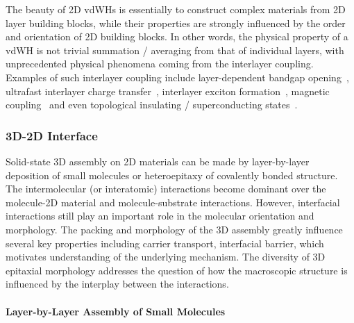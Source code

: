 The beauty of 2D vdWHs is essentially to construct complex materials
from 2D layer building blocks, while their properties are
strongly influenced by the order and orientation of 2D building
blocks.
%
In other words, the physical property of a vdWH is not trivial
summation / averaging from that of individual layers, with
unprecedented physical phenomena coming from the interlayer coupling.
%
Examples of such interlayer coupling include layer-dependent bandgap
opening~\autocite{Mak_2010_mos2,Raja_2017}, ultra\-fast interlayer charge
transfer~\autocite{Hong_2014_ultrafast_e_MoS2WS2,Zheng_2017_ultrafast_CT},
interlayer exciton formation~\autocite{Latini_2017_interlayer_ex},
magnetic coupling~\autocite{Huang_2017_magnet} and even topological
insulating / superconducting
states~\autocite{Cao_2018_insulator,Cao_2018_supercond}.


\subsubsection{3D-2D Interface}
\label{sec:intro-3D-2D}

Solid-state 3D assembly on 2D materials can be made by layer-by-layer
deposition of small molecules or hetero\-epitaxy of covalently bonded
structure. The intermolecular (or interatomic) interactions become
dominant over the molecule-2D material and molecule-substrate
interactions. However, interfacial interactions still play an
important role in the molecular orientation and morphology. The
packing and morphology of the 3D assembly greatly influence several
key properties including carrier transport, interfacial barrier, which
motivates understanding of the underlying mechanism.  The diversity of
3D epitaxial morphology addresses the question of how the macroscopic
structure is influenced by the interplay between the interactions.


\paragraph{Layer-by-Layer Assembly of Small Molecules}
\label{sec:org2cdd8f0}

